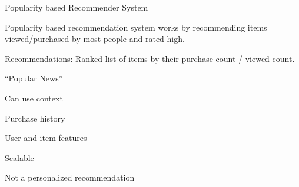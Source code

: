Popularity based Recommender System
	\begin{bulletedlist}
		\item Popularity based recommendation system works by recommending items viewed/purchased by most people and rated high.
		\item Recommendations: Ranked list of items by their purchase count / viewed count.
		\item``Popular News''
		\begin{bulletedlist}
			\item Can use context
			\item Purchase history
			\item User and item features
			\item Scalable
		\end{bulletedlist}
		\item Not a personalized recommendation
	\end{bulletedlist}

	\